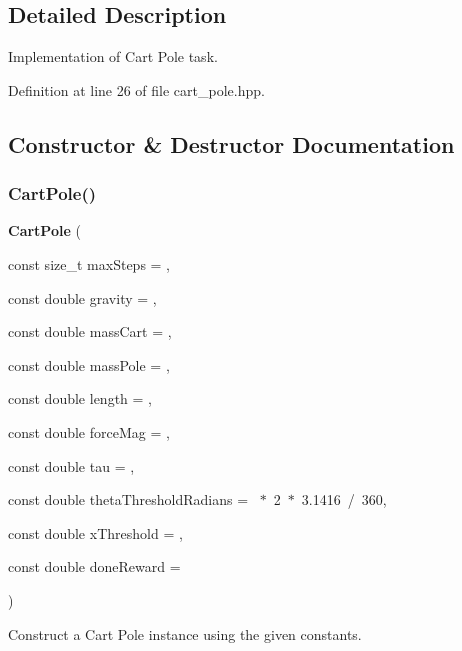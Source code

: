 \subsection{Detailed Description}
Implementation of Cart Pole task. 

Definition at line 26 of file cart\+\_\+pole.\+hpp.



\subsection{Constructor \& Destructor Documentation}
\mbox{\label{classmlpack_1_1rl_1_1CartPole_a20b2f2ab237d325d4d25a014581185d5}} 
\subsubsection{Cart\+Pole()}
{\footnotesize\ttfamily \textbf{ Cart\+Pole} (\begin{DoxyParamCaption}\item[{const size\+\_\+t}]{max\+Steps = {},  }\item[{const double}]{gravity = {},  }\item[{const double}]{mass\+Cart = {},  }\item[{const double}]{mass\+Pole = {},  }\item[{const double}]{length = {},  }\item[{const double}]{force\+Mag = {},  }\item[{const double}]{tau = {},  }\item[{const double}]{theta\+Threshold\+Radians = {~$\ast$~2~$\ast$~3.1416~/~360},  }\item[{const double}]{x\+Threshold = {},  }\item[{const double}]{done\+Reward = {} }\end{DoxyParamCaption})\hspace{0.3cm}{\ttfamily [inline]}}



Construct a Cart Pole instance using the given constants. 


